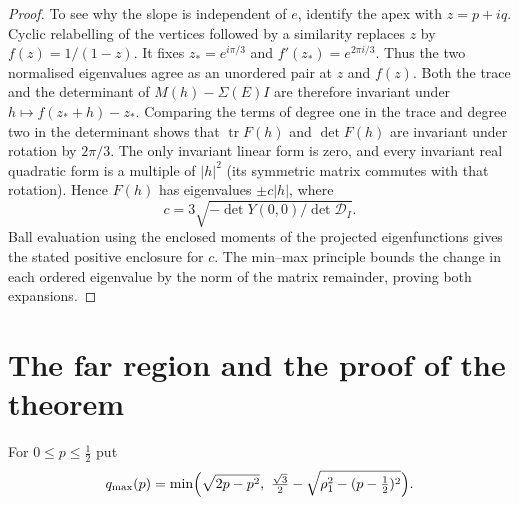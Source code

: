 \documentclass[11pt]{article}
\theoremstyle{definition}
\theoremstyle{remark}
\DeclareMathOperator{\tr}{tr}
\begin{document}
\begin{proof}
To see why the slope is independent of $e$, identify the apex with $z=p+iq$.
Cyclic relabelling of the vertices followed by a similarity replaces $z$ by $f(z)=1/(1-z)$.
It fixes $z_*=e^{i\pi/3}$ and $f'(z_*)=e^{2\pi i/3}$. Thus the two normalised eigenvalues agree as
an unordered pair at $z$ and $f(z)$. Both the trace and the determinant of $M(h)-\Sigma(E)I$
are therefore invariant under $h\mapsto f(z_*+h)-z_*$. Comparing the terms of degree one in the
trace and degree two in the determinant shows that $\tr F(h)$ and $\det F(h)$ are invariant under
rotation by $2\pi/3$. The only invariant linear form is zero, and every invariant real quadratic form
is a multiple of $|h|^2$ (its symmetric matrix commutes with that rotation).
Hence $F(h)$ has eigenvalues $\pm c|h|$, where
\[
 c=3\sqrt{-\det Y(0,0)/\det\mathcal D_I}.
\]
Ball evaluation using the enclosed moments of the projected eigenfunctions gives the stated positive
enclosure for $c$. The min--max principle bounds the change in each ordered eigenvalue by the norm
of the matrix remainder, proving both expansions.
\end{proof}

\section{The far region and the proof of the theorem}\label{sec:far}

For $0\le p\le\frac12$ put
\[q_{\max}(p)=\min\Bigl(\sqrt{2p-p^2},\ \tfrac{\sqrt3}{2}-\sqrt{\rho_1^2-(p-\tfrac12)^2}\Bigr).\]
\end{document}
